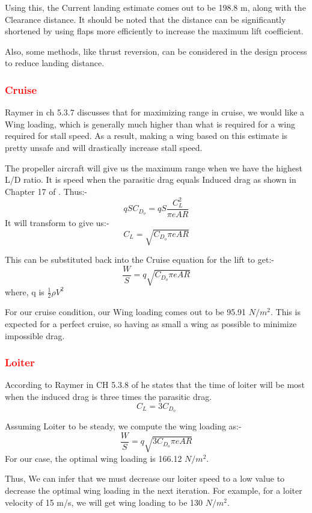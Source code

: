 \documentclass[12 pt]{article}
\begin{document}
Using this, the Current landing estimate comes out to be 198.8 m, along with the Clearance distance. It should be noted that the distance can be significantly shortened by using flaps more efficiently to increase the maximum lift coefficient.

Also, some methods, like thrust reversion, can be considered in the design process to reduce landing distance.


\subsubsection{\textcolor{red}{Cruise}}

Raymer in \cite{Raymer2006} ch 5.3.7 discusses that for maximizing range in cruise, we would like a Wing loading, which is generally much higher than what is required for a wing required for stall speed. As a result, making a wing based on this estimate is pretty unsafe and will drastically increase stall speed.

The propeller aircraft will give us the maximum range when we have the highest L/D ratio. It is speed when the parasitic drag equals Induced drag as shown in Chapter 17 of \cite{Raymer2006}. Thus:-
$$qSC_{D_o} = qS\frac{C_L^2}{\pi e AR}$$
It will transform to give us:- 
$$ C_L = \sqrt{C_{D_o} \pi e AR }$$

This can be substituted back into the Cruise equation for the lift to get:-
$$ \frac{W}{S} = q \sqrt{C_{D_o} \pi e AR}$$
where, q is $\frac{1}{2} \rho V^2 $

For our cruise condition, our Wing loading comes out to be 95.91 $N/m^2$. This is expected for a perfect cruise, so having as small a wing as possible to minimize impossible drag.

\subsubsection{\textcolor{red}{Loiter}}

According to Raymer in CH 5.3.8 of \cite{Raymer2006} he states that the time of loiter will be most when the induced drag is three times the parasitic drag. 
$$C_L = 3 C_{D_o}$$

Assuming Loiter to be steady, we compute the wing loading as:-
$$\frac{W}{S} = q \sqrt{3C_{D_o} \pi e AR}$$
For our case, the optimal wing loading is 166.12 $N/m^2$.

Thus, We can infer that we must decrease our loiter speed to a low value to decrease the optimal wing loading in the next iteration. For example, for a loiter velocity of 15 m/s, we will get wing loading to be 130 $N/m^2$.
\end{document}
